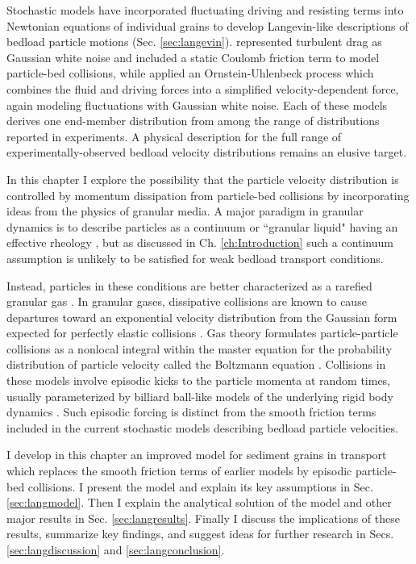 Stochastic models have incorporated fluctuating driving and resisting terms into Newtonian equations of individual grains to develop Langevin-like descriptions of bedload particle motions (Sec. \ref{sec:langevin}). \citet{Fan2014} represented turbulent drag as Gaussian white noise and included a static Coulomb friction term to model particle-bed collisions, while \citet{Ancey2014} applied an Ornstein-Uhlenbeck process which combines the fluid and driving forces into a simplified velocity-dependent force, again modeling fluctuations with Gaussian white noise.
Each of these models derives one end-member distribution from among the range of distributions reported in experiments.
A physical description for the full range of experimentally-observed bedload velocity distributions remains an elusive target.

In this chapter I explore the possibility that the particle velocity distribution is controlled by momentum dissipation from particle-bed collisions by incorporating ideas from the physics of granular media.
A major paradigm in granular dynamics is to describe particles as a continuum or ``granular liquid" having an effective rheology \citep[e.g.][]{Jenkins1998,Andreotti2013}, but as discussed in Ch. \ref{ch:Introduction} such a continuum assumption is unlikely to be satisfied for weak bedload transport conditions. 

Instead, particles in these conditions are better characterized as a rarefied granular gas \citep[e.g.][]{Furbish2021}. 
In granular gases, dissipative collisions are known to cause departures toward an exponential velocity distribution from the Gaussian form expected for perfectly elastic collisions \citep{Brilliantov2004}.
Gas theory formulates particle-particle collisions as a nonlocal integral within the master equation for the probability distribution of particle velocity called the Boltzmann equation \citep{Landau1969,Chapman1970,Brilliantov2004}.
Collisions in these models involve episodic kicks to the particle momenta at random times, usually parameterized by billiard ball-like models of the underlying rigid body dynamics \citep[e.g.][]{Brach1989}.
Such episodic forcing is distinct from the smooth friction terms included in the current stochastic models describing bedload particle velocities.

I develop in this chapter an improved model for sediment grains in transport which replaces the smooth friction terms of earlier models by episodic particle-bed collisions.
I present the model and explain its key assumptions in Sec. \ref{sec:langmodel}. Then I explain the analytical solution of the model and other major results in Sec. \ref{sec:langresults}. Finally I discuss the implications of these results, summarize key findings, and suggest ideas for further research in Secs. \ref{sec:langdiscussion} and \ref{sec:langconclusion}.


